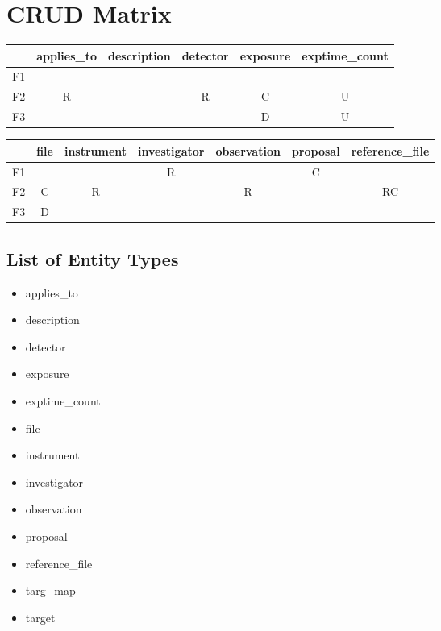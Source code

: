 \documentclass[a4paper,11pt]{article}
\begin{document}
\section{CRUD Matrix}
\begin{center}
 \begin{tabular}{||c c c c c c||} 
 \hline
 & applies\_to & description & detector & exposure & exptime\_count \\ [0.5ex] 
 \hline\hline
 F1 & & & & & \\ 
 \hline
 F2 & R &  & R & C & U \\  
 \hline
 F3 & & & & D & U \\  
 \hline
\end{tabular}
\end{center}

\begin{center}
 \begin{tabular}{||c c c c c c c||} 
 \hline
 & file & instrument & investigator & observation & proposal & reference\_file \\ [0.5ex] 
 \hline\hline
 F1 & & & R & & C & \\
 \hline
 F2 & C & R & & R & & RC \\
 \hline
 F3 & D & & & & & \\ 
 \hline
\end{tabular}
\end{center}

\subsection{List of Entity Types}
\begin{itemize}
	\item applies\_to
 	\item description
 	\item detector
 	\item exposure
 	\item exptime\_count
 	\item file
 	\item instrument
 	\item investigator
 	\item observation
 	\item proposal
 	\item reference\_file
 	\item targ\_map 
 	\item target 
\end{itemize}
\end{document}

